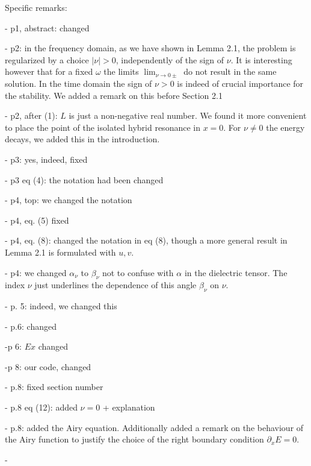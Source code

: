 \documentclass[a4paper,10pt]{article}
\begin{document}
Specific remarks: 

- p1, abstract: changed

- p2: in the frequency domain, as we have shown in Lemma 2.1, the problem is regularized by a choice $|\nu|>0$, independently of the sign of $\nu$. 
It is interesting however that for a fixed $\omega$ the limits $\lim_{\nu\rightarrow 0\pm}$ do not result in the same solution. 
In the time domain the sign of $\nu>0$ is indeed of crucial importance for the stability. We added a remark on this before Section 2.1  

- p2, after (1): $L$ is just a non-negative real number. We found it more convenient to place the point of the isolated hybrid resonance in $x=0$.
For $\nu\neq 0$ the energy decays, we added this in the introduction.


- p3: yes, indeed, fixed

- p3 eq (4): the notation had been changed
  
- p4, top: we changed the notation 

- p4, eq. (5) fixed

- p4, eq. (8): changed the notation in eq (8), though a more general result in Lemma 2.1 is formulated with $u,v$. 

- p4: we changed $\alpha_{\nu}$ to $\beta_{\nu}$ not to confuse with $\alpha$ in the dielectric tensor. The index $\nu$ 
just underlines the dependence of this angle $\beta_{\nu}$ on $\nu$.

- p. 5: indeed, we changed this 

- p.6:  changed

-p 6: $Ex$ changed

-p 8: our code, changed

 - p.8: fixed section number
 
 - p.8 eq (12): added $\nu=0$ + explanation
 
 - p.8: added the Airy equation. Additionally added a remark on the behaviour of the Airy function to justify the choice of the right boundary 
 condition $\partial_x E=0$. 
 
 -

  
 
\end{document}
